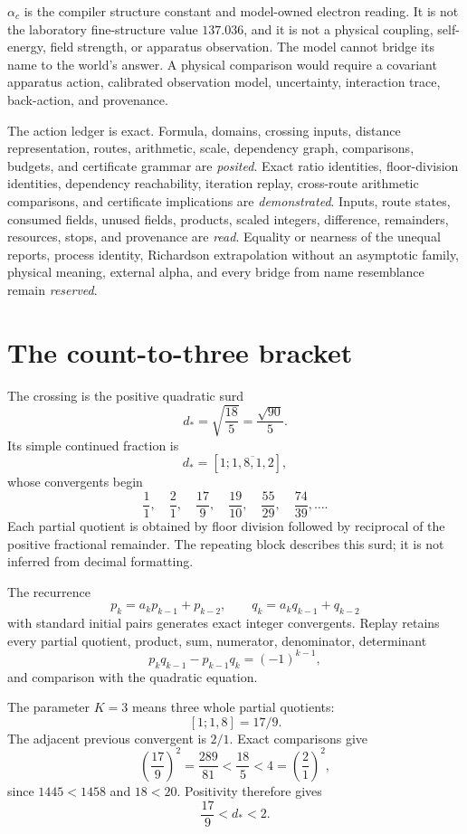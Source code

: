 \(\alpha_c\) is the compiler structure constant and model-owned electron reading.  It is not the laboratory
fine-structure value \(137.036\), and it is not a physical coupling, self-energy, field strength, or apparatus
observation.  The model cannot bridge its name to the world's answer.  A physical comparison would require a
covariant apparatus action, calibrated observation model, uncertainty, interaction trace, back-action, and
provenance.

The action ledger is exact.  Formula, domains, crossing inputs, distance representation, routes, arithmetic, scale,
dependency graph, comparisons, budgets, and certificate grammar are \emph{posited}.  Exact ratio identities,
floor-division identities, dependency reachability, iteration replay, cross-route arithmetic comparisons, and
certificate implications are \emph{demonstrated}.  Inputs, route states, consumed fields, unused fields, products,
scaled integers, difference, remainders, resources, stops, and provenance are \emph{read}.  Equality or nearness of
the unequal reports, process identity, Richardson extrapolation without an asymptotic family, physical meaning,
external alpha, and every bridge from name resemblance remain \emph{reserved}.
\section{The count-to-three bracket}

The crossing is the positive quadratic surd
\[
                         d_\ast=\sqrt{\frac{18}{5}}=\frac{\sqrt{90}}5.
\]
Its simple continued fraction is
\[
                         d_\ast=[1;\overline{1,8,1,2}],
\]
whose convergents begin
\[
                         \frac11,\quad\frac21,\quad\frac{17}{9},
\quad\frac{19}{10},\quad\frac{55}{29},\quad\frac{74}{39},\ldots.
\]
Each partial quotient is obtained by floor division followed by reciprocal of the positive fractional remainder.
The repeating block describes this surd; it is not inferred from decimal formatting.

The recurrence
\[
p_k=a_kp_{k-1}+p_{k-2},\qquad
q_k=a_kq_{k-1}+q_{k-2}
\]
with standard initial pairs generates exact integer convergents.  Replay retains every partial quotient, product,
sum, numerator, denominator, determinant
\[
                         p_kq_{k-1}-p_{k-1}q_k=(-1)^{k-1},
\]
and comparison with the quadratic equation.

The parameter \(K=3\) means three whole partial quotients:
\[
                         [1;1,8]=17/9.
\]
The adjacent previous convergent is \(2/1\).  Exact comparisons give
\[
\left(\frac{17}{9}\right)^2=\frac{289}{81}<\frac{18}{5}<4
=\left(\frac21\right)^2,
\]
since \(1445<1458\) and \(18<20\).  Positivity therefore gives
\[
                         \frac{17}{9}<d_\ast<2.
\]

